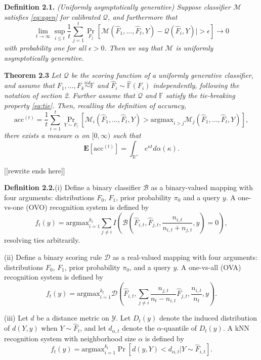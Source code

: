 \documentclass{article}
\newcommand{\E}{\textbf{E}}
\newcommand{\argmax}{\text{argmax}}
\begin{document}
\textbf{Definition 2.1.}  \emph{(Uniformly asymptotically generative) Suppose classifier $\mathcal{M}$ satisfies \eqref{eq:agen} for calibrated $\mathcal{Q}$, and furthermore that
\[
\lim_{t \to \infty} \sup_{i \leq t} \frac{1}{t}\sum_{j=1}^t \Pr_{F_j}[\mathcal{M}(\hat{F}_1,\hdots, \hat{F}_t, Y) - \mathcal{Q}(\hat{F}_i, Y)| > \epsilon] \to 0
\]
with probability one for all $\epsilon > 0$.  Then we say that $\mathcal{M}$ is uniformly asymptotically generative.}

\textbf{Theorem 2.3}\emph{
Let $\mathcal{Q}$ be the scoring function of a uniformly generative classifier, and 
assume that $F_1,\hdots, F_k \stackrel{iid}{\sim} \mathbb{F}$ and $\hat{F}_i \sim \hat{\mathbb{F}}(F_i)$ independently,
following the notation of section 2.
Further assume that $\mathcal{Q}$ and $\mathbb{F}$ satisfy the tie-breaking property \eqref{eq:tie}.
Then, recalling the definition of accuracy,
\[
\text{acc}^{(t)} = \frac{1}{t}\sum_{i=1}^t \Pr_{Y \sim F_i}[\mathcal{M}_i(\hat{F}_1,\hdots,\hat{F}_t, Y) > \argmax_{i > j} \mathcal{M}_j(\hat{F}_1,\hdots, \hat{F}_t, Y)],
\]
there exists a measure $\alpha$ on $[0, \infty)$ such that
\[
\E[\text{acc}^{(t)}] = \int_{\mathbb{R}^{+}} e^{\kappa t} d\alpha(\kappa).\]
}

[[rewrite ends here]]

\textbf{Definition 2.2.}(i) Define a binary classifier $\mathcal{B}$
as a binary-valued mapping with four arguments: distributions $F_0$,
$F_1$, prior probability $\pi_0$ and a query $y$.  A one-vs-one (OVO)
recognition system is defined by
\[
f_t(y) = \argmax_{i=1}^{k_t} \sum_{j \neq i} I\left(\mathcal{B}(\hat{F}_{i, t}, \hat{F}_{j, t}, \frac{n_{i, t}}{n_{i, t} + n_{j, t}}, y)=0\right),
\]
resolving ties arbitrarily.

(ii) Define a binary scoring rule $\mathcal{D}$ as a real-valued
mapping with four arguments: distributions $F_0$, $F_1$, prior
probability $\pi_0$, and a query $y$.  A one-vs-all (OVA) recognition
system is defined by
\[
f_t(y) = \argmax_{i=1}^{k_t} \mathcal{D}\left(\hat{F}_{i, t},
\sum_{j\neq i} \frac{n_{j, t}}{n_t - n_{i, t}}\hat{F}_{j, t},
\frac{n_{i, t}}{n_t}, y\right).
\]

(iii) Let $d$ be a distance metric on $\mathcal{Y}$.  Let $D_t(y)$
denote the induced distribution of $d(Y, y)$ when $Y \sim \hat{F}_t$,
and let $d_{\alpha, t}$ denote the $\alpha$-quantile of $D_t(y)$.  A
kNN recognition system with neighborhood size $\alpha$ is defined by
\[
f_t(y) = \argmax_{i=1}^{k_t} \Pr[d(y, Y) < d_{\alpha, t} |Y \sim \hat{F}_{i, t}].
\]
\end{document}
